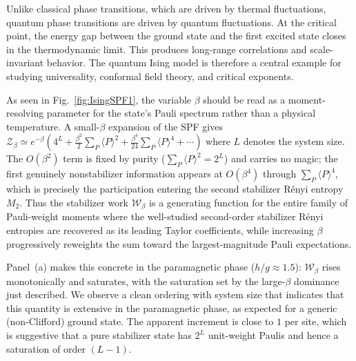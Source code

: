 \documentclass[aps,pra,superscriptaddress,twocolumn,longbibliography]{revtex4-2}
\def\mW{\mathcal{W}}
\def\mZ{\mathcal{Z}}
\begin{document}
Unlike classical phase transitions, which are driven by thermal fluctuations, quantum phase transitions are driven by quantum fluctuations. 
At the critical point, the energy gap between the ground state and the first excited state closes in the thermodynamic limit. This produces long-range correlations and scale-invariant behavior. The quantum Ising model is therefore a central example for studying universality, conformal field theory, and critical exponents.


As seen in Fig.~\ref{fig:IsingSPF1}, the variable $\beta$ should be read as a moment-resolving parameter for the
state's Pauli spectrum rather than a physical temperature. 
A small-$\beta$ expansion of the SPF gives
$\mZ_\beta \simeq e^{-\beta}( 4^L + \tfrac{\beta^2}{2}\sum_P\langle P\rangle^2
+ \tfrac{\beta^4}{24}\sum_P\langle P\rangle^4+\cdots)$ where $L$ denotes the system size.
The $O(\beta^2)$ term is fixed by purity
($\sum_P\langle P\rangle^2=2^L$) and carries no magic; the first genuinely
nonstabilizer information appears at $O(\beta^4)$ through
$\sum_P\langle P\rangle^4$, which is precisely the participation entering the
second stabilizer R\'enyi entropy $M_2$. 
Thus the stabilizer work $\mW_\beta$ is a generating function for the entire family of Pauli-weight moments where the well-studied second-order stabilizer R\'enyi entropies are recovered as its leading Taylor coefficients, while increasing $\beta$ progressively reweights the sum toward the largest-magnitude Pauli expectations. 

Panel~(a) makes this concrete in the paramagnetic phase ($h/g\approx1.5$):
$\mW_\beta$ rises monotonically and saturates, with the saturation set by the
large-$\beta$ dominance just described.
We observe a clean ordering with system size that indicates that this quantity is extensive in the paramagnetic phase, as expected for a generic (non-Clifford) ground state. 
The apparent increment is close to $1$ per
site, which is suggestive that a pure stabilizer state has $2^L$ unit-weight Paulis
and hence a saturation of order $(L-1)$. 
\end{document}
